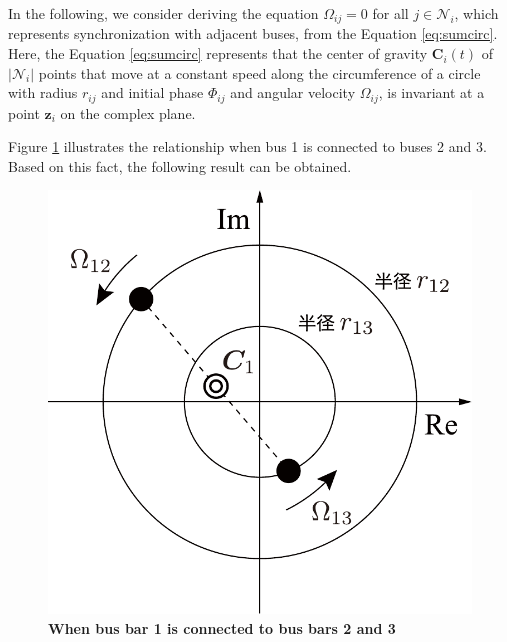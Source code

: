 \documentclass[graybox, envcountchap]{svmult}
\begin{document}
In the following, we consider deriving the equation $\Omega_{ij}=0$ for all
$j\in \mathcal{N}_i$, which represents synchronization with adjacent buses, from
the Equation \ref{eq:sumcirc}. Here, the Equation \ref{eq:sumcirc} represents
that the center of gravity $\bm{C}_i (t)$ of $|\mathcal{N}_i|$ points that move at
a constant speed along the circumference of a circle with radius $r_{ij}$ and
initial phase $\Phi_{ij}$ and angular velocity $\Omega_{ij}$, is invariant at a
point $\bm{z}_i$ on the complex plane.

Figure \ref{fig:centerg} illustrates the relationship when bus 1 is connected to
buses 2 and 3. Based on this fact, the following result can be obtained.

\begin{figure}[t]
  \centering
  \includegraphics[width = .4\linewidth]{figs/centerg}
  \medskip
  \caption{\textbf{When bus bar 1 is connected to bus bars 2 and 3}}
  \label{fig:centerg}
  \medskip
\end{figure}
\end{document}
